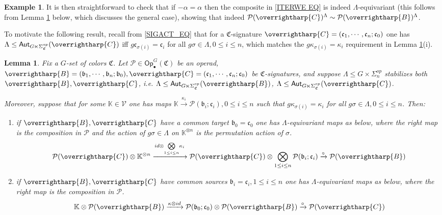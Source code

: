 \documentclass[a4paper,10pt
,draft
]{article}%
\numberwithin{equation}{section}
\numberwithin{figure}{section}
\newtheorem{lemma}[equation]{Lemma}%
\theoremstyle{definition} %
\newtheorem{example}[equation]{Example}%
\newcommand{\vect}[1]{\text{\overrightharp{\ensuremath{#1}}}}
\newcommand{\V}{\ensuremath{\mathcal V}}
\renewcommand{\P}{\ensuremath{\mathcal P}}
\newcommand{\1}{\ensuremath{\mathbbm 1}}%
\begin{document}
\begin{example}
It is then straightforward to check that if $-\alpha = \alpha$
then the composite in \eqref{ITERWE EQ}
is indeed $\Lambda$-equivariant
(this follows from Lemma \ref{LAMBEQMAPS LEM} below, which discusses the general case), showing that indeed
$\P(\vect{C})^{\Lambda} \sim \P(\vect{B})^{\Lambda}$.
\end{example}


To motivate the following result, recall from \eqref{SIGACT_EQ} that
for a $\mathfrak{C}$-signature
$\vect{C} = (\mathfrak{c}_1,\cdots,\mathfrak{c}_n;\mathfrak{c}_0)$
one has $\Lambda \leq \mathsf{Aut}_{G \ltimes \Sigma^{op}_{\mathfrak{C}}}(\vect{C})$
iff 
$g \mathfrak{c}_{\sigma(i)} = \mathfrak{c}_i$
for all $g\sigma \in \Lambda, 0\leq i \leq n$,
which matches the $g \kappa_{\sigma(i)} = \kappa_i$
requirement in Lemma \ref{LAMBEQMAPS LEM}(i).


\begin{lemma}\label{LAMBEQMAPS LEM}
Fix a $G$-set of colors $\mathfrak{C}$.
Let $\P \in \mathsf{Op}^G_\bullet(\mathfrak{C})$ be an operad,
$\vect{B}=(\mathfrak{b}_1,\cdots,\mathfrak{b}_n;\mathfrak{b}_0),\vect{C}=(\mathfrak{c}_1,\cdots,\mathfrak{c}_n;\mathfrak{c}_0)$ be $\mathfrak{C}$-signatures,
and suppose 
$\Lambda \leq G \times \Sigma_n^{op}$
stabilizes both $\vect{B},\vect{C}$, i.e. 
$\Lambda \leq \mathsf{Aut}_{G\ltimes \Sigma_{\mathfrak{C}}^{op}}(\vect{B})$, 
$\Lambda \leq \mathsf{Aut}_{G\ltimes \Sigma_{\mathfrak{C}}^{op}}(\vect{C})$.

Moreover, suppose that for some $\mathbb{K} \in \V$
one has maps 
$\mathbb{K} \xrightarrow{\kappa_i} \P(\mathfrak{b}_i;\mathfrak{c}_i), 0\leq i \leq n$
such that $g\kappa_{\sigma(i)} = \kappa_i$ for all $g\sigma\in \Lambda,0\leq i \leq n$. Then:
\begin{enumerate}[label=(\roman*)]
\item if $\vect{B},\vect{C}$ have a common target $\mathfrak{b}_0=\mathfrak{c}_0$
one has
$\Lambda$-equivariant maps as below, where the right map is the composition in $\P$
and the action of $g\sigma\in \Lambda$ on $\mathbb{K}^{\otimes n}$
is the permutation action of $\sigma$.
\begin{equation}\label{LAMBEQMAPS EQ}
	\P(\vect{C}) \otimes %
	\mathbb{K}^{\otimes n}
\xrightarrow{id \otimes \underset{1\leq i \leq n}{\bigotimes} \kappa_i}
	\P(\vect{C}) \otimes \bigotimes_{1\leq i \leq n} \P(\mathfrak{b}_i;\mathfrak{c}_i)
	\xrightarrow{\circ}
	\P(\vect{B})
\end{equation}
\item
if $\vect{B},\vect{C}$ have common sources $\mathfrak{b}_i=\mathfrak{c}_i,1\leq i \leq n$ 
one has
$\Lambda$-equivariant maps as below, where the right map is the composition in $\P$.
\[
	\mathbb{K} \otimes \P(\vect{B}) 
\xrightarrow{\kappa \otimes id}
	\P(\mathfrak{b}_0;\mathfrak{c}_0) \otimes \P(\vect{B}) 
	\xrightarrow{\circ}
	\P(\vect{C})
\]
\end{enumerate}
\end{lemma}
\end{document}
